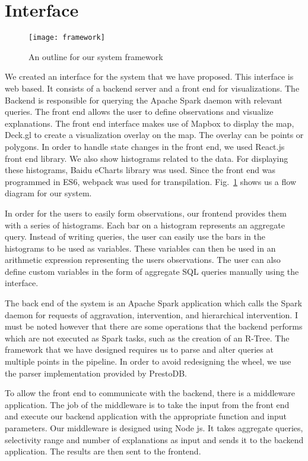 \section{Interface}

\begin{figure}[h]
\texttt{[image: framework]}
\caption{An outline for our system framework}
\label{fig:framework}
\end{figure}

We created an interface for the system that we have proposed. This interface is web based. It consists of a backend server and a front end for visualizations. The Backend is responsible for querying the Apache Spark daemon with relevant queries. The front end allows the user to define observations and visualize explanations. The front end interface makes use of Mapbox to display the map, Deck.gl to create a visualization overlay on the map. The overlay can be points or polygons. In order to handle state changes in the front end, we used React.js front end library. We also show histograms related to the data. For displaying these histograms, Baidu eCharts library was used. Since the front end was programmed in ES6, webpack was used for transpilation\citep{webpack}. Fig.~\ref{fig:framework} shows us a flow diagram for our system.

In order for the users to easily form observations, our frontend provides them with a series of histograms. Each bar on a histogram represents an aggregate query. Instead of writing queries, the user can easily use the bars in the histograms to be used as variables. These variables can then be used in an arithmetic expression representing the users observations. The user can also define custom variables in the form of aggregate SQL queries manually using the interface.

The back end of the system is an Apache Spark application which calls the Spark daemon for requests of aggravation, intervention, and hierarchical intervention. I must be noted however that there are some operations that the backend performs which are not executed as Spark tasks, such as the creation of an R-Tree. The framework that we have designed requires us to parse and alter queries at multiple points in the pipeline. In order to avoid redesigning the wheel, we use the parser implementation provided by PrestoDB\citep{prestodb}.

To allow the front end to communicate with the backend, there is a middleware application. The job of the middleware is to take the input from the front end and execute our backend application with the appropriate function and input parameters. Our middleware is designed using Node js\citep{tilkov2010node,cantelon2017node}. It takes aggregate queries, selectivity range and number of explanations as input and sends it to the backend application. The results are then sent to the frontend.

